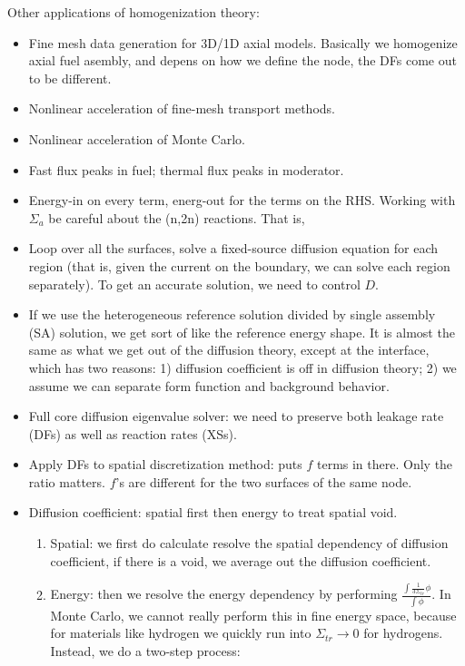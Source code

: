\documentclass{school-22.211-notes}
\begin{document}
Other applications of homogenization theory: 
\begin{itemize}
\item Fine mesh data generation for 3D/1D axial models. Basically we homogenize axial fuel asembly, and depens on how we define the node, the DFs come out to be different. 
\item Nonlinear acceleration of fine-mesh transport methods. 
\item Nonlinear acceleration of Monte Carlo. 
\end{itemize}



\clearpage
{}
\begin{itemize}
\item Fast flux peaks in fuel; thermal flux peaks in moderator. 
\item Energy-in on every term, energ-out for the terms on the RHS. Working with $\Sigma_a$ be careful about the (n,2n) reactions. That is, 
\item Loop over all the surfaces, solve a fixed-source diffusion equation for each region (that is, given the current on the boundary, we can solve each region separately). To get an accurate solution, we need to control $D$. 
\item If we use the heterogeneous reference solution divided by single assembly (SA) solution, we get sort of like the reference energy shape. It is almost the same as what we get out of the diffusion theory, except at the interface, which has two reasons: 1) diffusion coefficient is off in diffusion theory; 2) we assume we can separate form function and background behavior. 
\item Full core diffusion eigenvalue solver: we need to preserve both leakage rate (DFs) as well as reaction rates (XSs). 
\item Apply DFs to spatial discretization method: puts $f$ terms in there. Only the ratio matters. $f$'s are different for the two surfaces of the same node. 
\item Diffusion coefficient: spatial first then energy to treat spatial void. 
  \begin{enumerate}
    \item Spatial: we first do calculate resolve the spatial dependency of diffusion coefficient, if there is a void, we average out the diffusion coefficient.
    \item Energy: then we resolve the energy dependency by performing $\displaystyle \frac{\int \frac{1}{3\Sigma_{tr}} \phi}{\int \phi}$. In Monte Carlo, we cannot really perform this in fine energy space, because for materials like hydrogen we quickly run into $\Sigma_{tr} \to 0$ for hydrogens. Instead, we do a two-step process: 

\end{enumerate}
\end{itemize}
\end{document}
